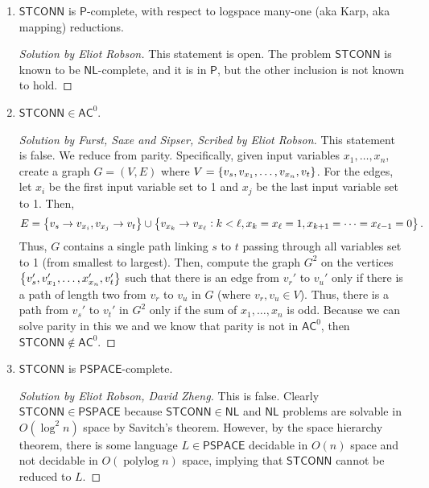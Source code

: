 \documentclass{article}
\newenvironment{solution}[1]{\begin{proof}[Solution by #1]}{\end{proof}}
\newenvironment{scribed}[2]{\begin{proof}[Solution by #1, Scribed by #2]}{\end{proof}}
\newcommand{\Pe}{\mathsf{P}}
\newcommand{\PSPACE}{\mathsf{PSPACE}}
\newcommand{\STCONN}{\mathsf{STCONN}}
\newcommand{\NL}{\mathsf{NL}}
\newcommand{\AC}{\mathsf{AC}}
\DeclareMathOperator*{\polylog}{polylog}
\begin{document}
\begin{enumerate}
    \item \(\STCONN\) is \(\Pe\)-complete, with respect to logspace many-one (aka Karp, aka mapping) reductions.
    
    \begin{solution}{Eliot Robson}
    	This statement is open. The problem \(\STCONN\) is known to be \(\NL\)-complete, and it is in \(\Pe\), but the other inclusion is not known to hold.
    \end{solution}
    
    \item \(\STCONN \in \AC^0\). %
    
    \begin{scribed}{Furst, Saxe and Sipser}{Eliot Robson}
    	This statement is false. We reduce from parity. Specifically, given input variables \(x_1, \dots, x_n\), create a graph \(G = (V,E)\) where \(V = \set{v_{s}, v_{x_1}, \dots, v_{x_n}, v_{t}}\). For the edges, let \(x_i\) be the first input variable set to 1 and \(x_j\) be the last input variable set to 1. Then, 
    	\[
    		E
    		=%
    		\set{v_{s} \to v_{x_i}, v_{x_j} \to v_{t}}
    		\cup%
    		\set{v_{x_k} \to v_{x_\ell} : k < \ell, x_k = x_\ell = 1, x_{k+1} = \dots = x_{\ell-1} = 0}.
    	\]
    	Thus, \(G\) contains a single path linking \(s\) to \(t\) passing through all variables set to 1 (from smallest to largest). Then, compute the graph \(G^2\) on the vertices \(\set{v_{s}', v_{x_1}', \dots, x_{x_n}', v_{t}'}\) such that there is an edge from \(v_{r}'\) to \(v_{u}'\) only if there is a path of length two from \(v_{r}\) to \(v_{u}\) in \(G\) (where \(v_{r}, v_{u} \in V\)). Thus, there is a path from \(v_{s}'\) to \(v_{t}'\) in \(G^2\) only if the sum of \(x_1, \dots, x_n\) is odd. Because we can solve parity in this we and we know that parity is not in \(\AC^0\), then \(\STCONN \notin \AC^0\).
    \end{scribed}
    
    \item \(\STCONN\) is \(\PSPACE\)-complete.
    
    \begin{solution}{Eliot Robson, David Zheng}
    	This is false. Clearly \(\STCONN \in \PSPACE\) because \(\STCONN \in \NL\) and \(\NL\) problems are solvable in \(O(\log^2 n)\) space by Savitch's theorem. However, by the space hierarchy theorem, there is some language \(L \in \PSPACE\) decidable in \(O(n)\) space and not decidable in \(O(\polylog n)\) space, implying that \(\STCONN\) cannot be reduced to \(L\).
    \end{solution}
    

\end{enumerate}
\end{document}
